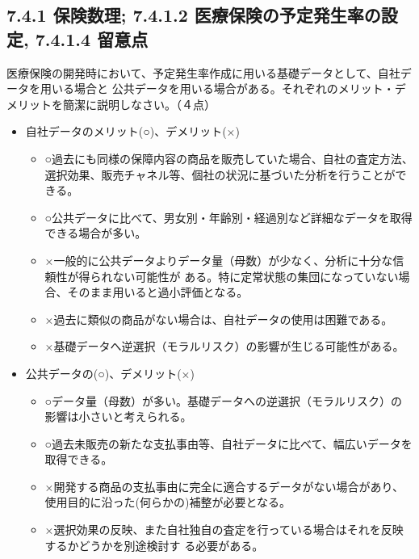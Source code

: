 \documentclass[report,gutter=10mm,fore-edge=10mm,uplatex,dvipdfmx]{jlreq}
\begin{document}
\subsection{7.4.1  保険数理; 7.4.1.2 医療保険の予定発生率の設定, 7.4.1.4 留意点}
医療保険の開発時において、予定発生率作成に用いる基礎データとして、自社データを用いる場合と
公共データを用いる場合がある。それぞれのメリット・デメリットを簡潔に説明しなさい。（４点）
\begin{itemize}
 \item 自社データのメリット(○)、デメリット(×)
\begin{itemize}
 \item ○過去にも同様の保障内容の商品を販売していた場合、自社の査定方法、選択効果、販売チャネル等、個社の状況に基づいた分析を行うことができる。
 \item ○公共データに比べて、男女別・年齢別・経過別など詳細なデータを取得できる場合が多い。
 \item ×一般的に公共データよりデータ量（母数）が少なく、分析に十分な信頼性が得られない可能性が
ある。特に定常状態の集団になっていない場合、そのまま用いると過小評価となる。
 \item ×過去に類似の商品がない場合は、自社データの使用は困難である。
 \item ×基礎データへ逆選択（モラルリスク）の影響が生じる可能性がある。
\end{itemize}
 \item 公共データの(○)、デメリット(×)
\begin{itemize}
 \item ○データ量（母数）が多い。基礎データへの逆選択（モラルリスク）の影響は小さいと考えられる。
 \item ○過去未販売の新たな支払事由等、自社データに比べて、幅広いデータを取得できる。
 \item ×開発する商品の支払事由に完全に適合するデータがない場合があり、使用目的に沿った(何らかの)補整が必要となる。
 \item ×選択効果の反映、また自社独自の査定を行っている場合はそれを反映するかどうかを別途検討す
る必要がある。
\end{itemize}
\end{itemize}
\end{document}
